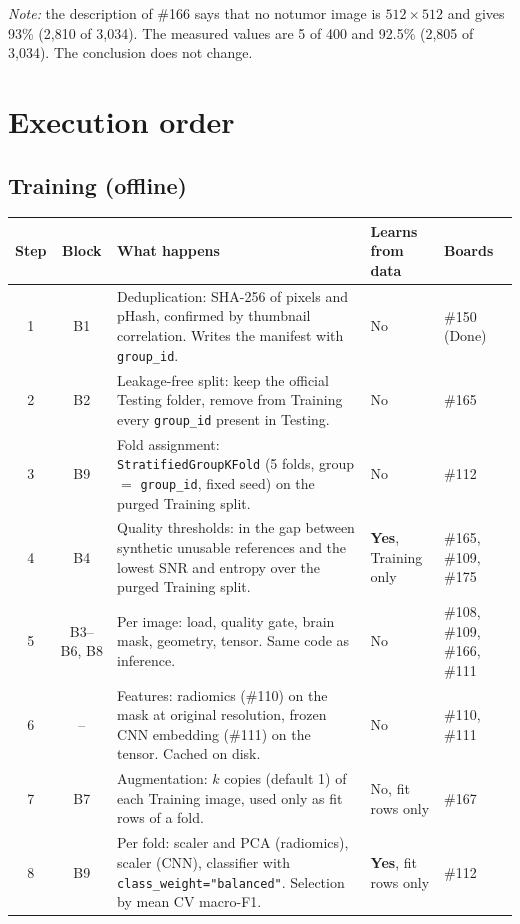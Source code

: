 \documentclass[11pt,a4paper]{article}
\newcommand{\board}[1]{\textsf{\##1}}
\begin{document}
\emph{Note:} the description of \board{166} says that no notumor image is $512\times512$ and gives 93\% (2,810 of 3,034). The measured values are 5 of 400 and 92.5\% (2,805 of 3,034). The conclusion does not change.

\section{Execution order}

\subsection{Training (offline)}

\begin{longtable}{@{}c c p{7.2cm} p{2.4cm} p{1.9cm}@{}}
\toprule
Step & Block & What happens & Learns from data & Boards \\
\midrule
\endhead
1  & B1 & Deduplication: SHA-256 of pixels and pHash, confirmed by thumbnail correlation. Writes the manifest with \texttt{group\_id}. & No & \board{150} (Done) \\
2  & B2 & Leakage-free split: keep the official Testing folder, remove from Training every \texttt{group\_id} present in Testing. & No & \board{165} \\
3  & B9 & Fold assignment: \texttt{StratifiedGroupKFold} (5 folds, group $=$ \texttt{group\_id}, fixed seed) on the purged Training split. & No & \board{112} \\
4  & B4 & Quality thresholds: in the gap between synthetic unusable references and the lowest SNR and entropy over the purged Training split. & \textbf{Yes}, Training only & \board{165}, \board{109}, \board{175} \\
5  & B3--B6, B8 & Per image: load, quality gate, brain mask, geometry, tensor. Same code as inference. & No & \board{108}, \board{109}, \board{166}, \board{111} \\
6  & -- & Features: radiomics (\board{110}) on the mask at original resolution, frozen CNN embedding (\board{111}) on the tensor. Cached on disk. & No & \board{110}, \board{111} \\
7  & B7 & Augmentation: $k$ copies (default 1) of each Training image, used only as fit rows of a fold. & No, fit rows only & \board{167} \\
8  & B9 & Per fold: scaler and PCA (radiomics), scaler (CNN), classifier with \texttt{class\_weight="balanced"}. Selection by mean CV macro-F1. & \textbf{Yes}, fit rows only & \board{112} \\

\end{longtable}
\end{document}
